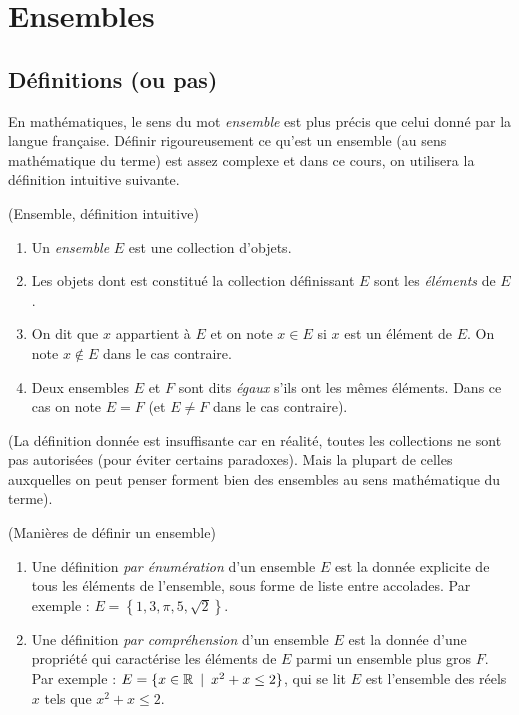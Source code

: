 \chapter{Ensembles}

\section{Définitions (ou pas)}

En mathématiques, le sens du mot \emph{ensemble} est plus précis que celui donné par la langue française. Définir rigoureusement ce qu'est un ensemble (au sens mathématique du terme) est assez complexe et dans ce cours, on utilisera la définition intuitive suivante.

\begin{definition}(Ensemble, définition intuitive)

\begin{enumerate}
\item Un \emph{ensemble} $E$ est une collection d'objets.
\item Les objets dont est constitué la collection définissant $E$  sont les \emph{éléments} de $E$.
\item On dit que $x$ appartient à $E$ et on note $x\in E$ si $x$ est un élément de $E$. On note $x\not\in E$ dans le cas contraire.
\item Deux ensembles $E$ et $F$ sont dits \emph{égaux} s'ils ont les mêmes éléments. Dans ce cas on note $E=F$ (et $E\neq F$ dans le cas contraire).
\end{enumerate}
\end{definition}

(La définition donnée est insuffisante car en réalité, toutes les collections ne sont pas autorisées (pour éviter certains paradoxes). Mais la plupart de celles auxquelles on peut penser forment bien des ensembles au sens mathématique du terme). 

\begin{definition}(Manières de définir un ensemble)

\begin{enumerate}
\item Une définition \emph{par énumération} d'un ensemble $E$ est la donnée explicite de tous les éléments de l'ensemble, sous forme de liste entre accolades. Par exemple : $E = \left\{1,3,\pi,5,\sqrt2\right\}$.
\item Une définition \emph{par compréhension} d'un ensemble $E$ est la donnée d'une propriété qui caractérise les éléments de $E$ parmi un ensemble plus gros $F$. Par exemple : $E = \{x\in \mathbb{R}\:\mid\: x^2+x\leq 2\}$, qui se lit \og$E$ est l'ensemble des réels $x$ tels que $x^2+x\leq 2$\fg.
\end{enumerate}
\end{definition}

